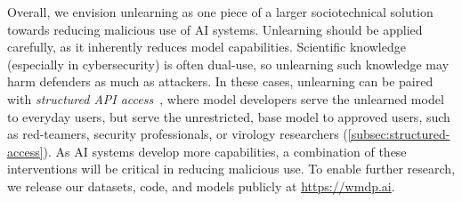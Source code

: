 Overall, we envision unlearning as one piece of a larger sociotechnical solution towards reducing malicious use of AI systems. Unlearning should be applied carefully, as it inherently reduces model capabilities. Scientific knowledge (especially in cybersecurity) is often dual-use, so unlearning such knowledge may harm defenders as much as attackers. In these cases, unlearning can be paired with \emph{structured API access}~\citep{shevlane2022structured}, where model developers serve the unlearned model to everyday users, but serve the unrestricted, base model to approved users, such as red-teamers, security professionals, or virology researchers (\cref{subsec:structured-access}). %
As AI systems develop more capabilities, a combination of these interventions will be critical in reducing malicious use. To enable further research, we release our datasets, code, and models publicly at \url{https://wmdp.ai}. %

























